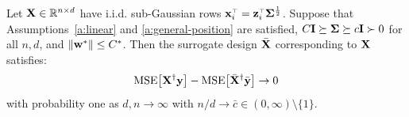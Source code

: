 \documentclass[11pt]{article}
\begin{document}
\begin{theorem}
  \label{t:asymptotic}
  Let $\mathbf X \in \mathbb{R}^{n \times d}$ have i.i.d. sub-Gaussian rows $\x_i^\top = \z_i^\top\Sigmab^{\frac12}$.
  Suppose that Assumptions~\ref{a:linear}
  and \ref{a:general-position} are satisfied,
  $C \mathbf I \succeq \mathbf{\Sigma} \succeq c \mathbf I \succ 0$ for all $n,d$,
  and $\| \mathbf w^* \| \le C^*$. Then the surrogate design ${\bar{\mathbf X}}$
  corresponding to $\mathbf X$ satisfies:
  \begin{align*}
    {\mathrm{MSE}\big[\mathbf X^\dagger\mathbf y\big]} - {\mathrm{MSE}\big[ {\bar{\mathbf X}}^\dagger\bar{\mathbf y} \big]} \to 0
  \end{align*}
  with probability one as $d,n \to \infty$ with $n/d \to \bar c \in (0,\infty) \setminus \{1\}$.
\end{theorem}

\end{document}

